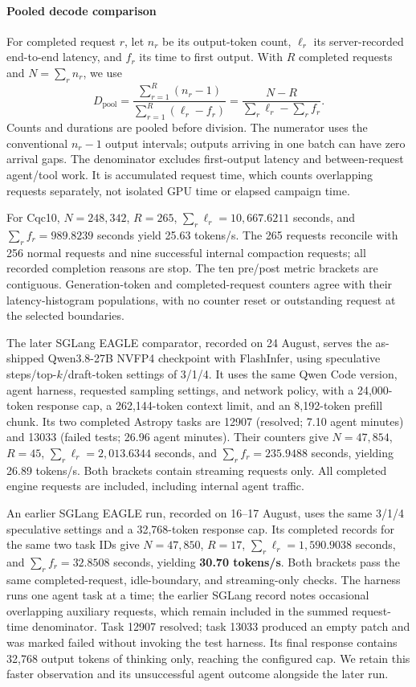 \paragraph{Pooled decode comparison}
For completed request $r$, let $n_r$ be its output-token count, $\ell_r$ its server-recorded end-to-end latency, and $f_r$ its time to first output. With $R$ completed requests and $N=\sum_r n_r$, we use
\begin{equation}
 D_{\mathrm{pool}} =
 \frac{\sum_{r=1}^{R}(n_r-1)}{\sum_{r=1}^{R}(\ell_r-f_r)}
 = \frac{N-R}{\sum_r\ell_r-\sum_r f_r}.
 \label{eq:pooled-decode}
\end{equation}
Counts and durations are pooled before division. The numerator uses the conventional $n_r-1$ output intervals; outputs arriving in one batch can have zero arrival gaps. The denominator excludes first-output latency and between-request agent/tool work. It is accumulated request time, which counts overlapping requests separately, not isolated GPU time or elapsed campaign time.

For Cqc10, $N=248{,}342$, $R=265$, $\sum_r\ell_r=10{,}667.6211$ seconds, and $\sum_r f_r=989.8239$ seconds yield 25.63 tokens/s. The 265 requests reconcile with 256 normal requests and nine successful internal compaction requests; all recorded completion reasons are stop. The ten pre/post metric brackets are contiguous. Generation-token and completed-request counters agree with their latency-histogram populations, with no counter reset or outstanding request at the selected boundaries.

The later SGLang EAGLE comparator, recorded on 24 August, serves the as-shipped Qwen3.8-27B NVFP4 checkpoint with FlashInfer, using speculative steps/top-$k$/draft-token settings of 3/1/4. It uses the same Qwen Code version, agent harness, requested sampling settings, and network policy, with a 24,000-token response cap, a 262,144-token context limit, and an 8,192-token prefill chunk. Its two completed Astropy tasks are 12907 (resolved; 7.10 agent minutes) and 13033 (failed tests; 26.96 agent minutes). Their counters give $N=47{,}854$, $R=45$, $\sum_r\ell_r=2{,}013.6344$ seconds, and $\sum_r f_r=235.9488$ seconds, yielding 26.89 tokens/s. Both brackets contain streaming requests only. All completed engine requests are included, including internal agent traffic.

An earlier SGLang EAGLE run, recorded on 16--17 August, uses the same 3/1/4 speculative settings and a 32,768-token response cap. Its completed records for the same two task IDs give $N=47{,}850$, $R=17$, $\sum_r\ell_r=1{,}590.9038$ seconds, and $\sum_r f_r=32.8508$ seconds, yielding \textbf{30.70 tokens/s}. Both brackets pass the same completed-request, idle-boundary, and streaming-only checks. The harness runs one agent task at a time; the earlier SGLang record notes occasional overlapping auxiliary requests, which remain included in the summed request-time denominator. Task 12907 resolved; task 13033 produced an empty patch and was marked failed without invoking the test harness. Its final response contains 32,768 output tokens of thinking only, reaching the configured cap. We retain this faster observation and its unsuccessful agent outcome alongside the later run.

